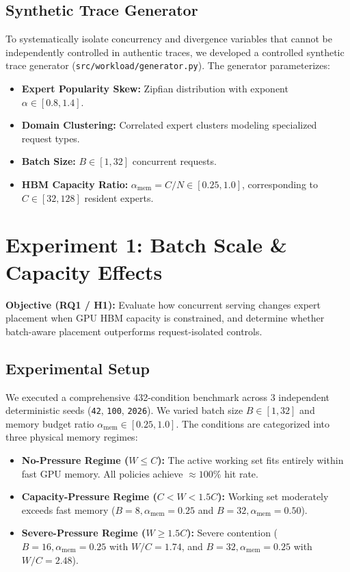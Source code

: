 \documentclass[10pt,journal,compsoc]{IEEEtran}
\begin{document}
\subsection{Synthetic Trace Generator}
To systematically isolate concurrency and divergence variables that cannot be independently controlled in authentic traces, we developed a controlled synthetic trace generator (\texttt{src/workload/generator.py}). The generator parameterizes:
\begin{itemize}
    \item \textbf{Expert Popularity Skew:} Zipfian distribution with exponent $\alpha \in [0.8, 1.4]$.
    \item \textbf{Domain Clustering:} Correlated expert clusters modeling specialized request types.
    \item \textbf{Batch Size:} $B \in [1, 32]$ concurrent requests.
    \item \textbf{HBM Capacity Ratio:} $\alpha_{\text{mem}} = C/N \in [0.25, 1.0]$, corresponding to $C \in [32, 128]$ resident experts.
\end{itemize}

\section{Experiment 1: Batch Scale \& Capacity Effects}
\label{sec:exp01}

\textbf{Objective (RQ1 / H1):} Evaluate how concurrent serving changes expert placement when GPU HBM capacity is constrained, and determine whether batch-aware placement outperforms request-isolated controls.

\subsection{Experimental Setup}
We executed a comprehensive 432-condition benchmark across 3 independent deterministic seeds (\texttt{42}, \texttt{100}, \texttt{2026}). We varied batch size $B \in [1, 32]$ and memory budget ratio $\alpha_{\text{mem}} \in [0.25, 1.0]$. The conditions are categorized into three physical memory regimes:
\begin{itemize}
    \item \textbf{No-Pressure Regime ($W \le C$):} The active working set fits entirely within fast GPU memory. All policies achieve $\approx 100\%$ hit rate.
    \item \textbf{Capacity-Pressure Regime ($C < W < 1.5C$):} Working set moderately exceeds fast memory ($B=8, \alpha_{\text{mem}}=0.25$ and $B=32, \alpha_{\text{mem}}=0.50$).
    \item \textbf{Severe-Pressure Regime ($W \ge 1.5C$):} Severe contention ($B=16, \alpha_{\text{mem}}=0.25$ with $W/C=1.74$, and $B=32, \alpha_{\text{mem}}=0.25$ with $W/C=2.48$).
\end{itemize}
\end{document}
